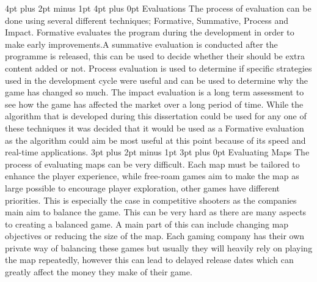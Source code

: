 \documentclass[12pt,a4paper,oneside]{book}
\makeatletter
\renewcommand\subsection{\@startsection {subsection}{1}{2mm} %
                               {3pt plus 2pt minus 1pt} %
                               {3pt plus 0pt} %
                               {\normalfont\bfseries}}
\renewcommand\section{\@startsection {section}{1}{0mm} %
                               {4pt plus 2pt minus 1pt} %
                               {4pt plus 0pt} %
                               {\bfseries}}
\makeatother
\begin{document}
\section{Evaluations}
The process of evaluation can be done using several different techniques; Formative, Summative, Process and Impact. Formative evaluates the program during the development in order to make early improvements.A summative evaluation is conducted after the programme is released, this can be used to decide whether their should be extra content added or not. Process evaluation is used to determine if specific strategies used in the development cycle were useful and can be used to determine why the game has changed so much. The impact evaluation is a long term assessment to see how the game has affected the market over a long period of time. While the algorithm that is developed during this dissertation could be used for any one of these techniques it was decided that it would be used as a Formative evaluation as the algorithm could aim be most useful at this point because of its speed and real-time applications.  
\subsection{Evaluating Maps}  
 The process of evaluating maps can be very difficult. Each map must be tailored to enhance the player experience, while free-roam games aim to make the map as large  possible to encourage player exploration, other games have different priorities. This is especially the case in competitive shooters as the companies main aim to balance the game. This can be very hard as there are many aspects to creating a balanced game. A main part of this can include changing map objectives or reducing the size of the map. Each gaming company has their own private way of balancing these games but usually they will heavily rely on playing the map repeatedly, however this can lead to delayed release dates which can greatly affect the money they make of their game.
\vspace{5mm} 
\newline
\end{document}
